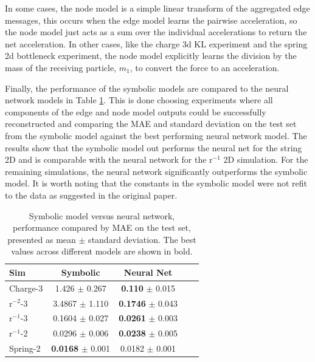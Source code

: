 \documentclass[11pt]{article}
\begin{document}
    In some cases, the node model is a simple linear transform of the aggregated edge messages, this occurs when the edge model learns the pairwise acceleration, so the node model just acts as a sum over the individual accelerations to return the net acceleration. In other cases, like the charge 3d KL experiment and the spring 2d bottleneck experiment, the node model explicitly learns the division by the mass of the receiving particle, $m_1$, to convert the force to an acceleration.

    Finally, the performance of the symbolic models are compared to the neural network models in Table \ref{tab:sr_vs_nn_table}. This is done choosing experiments where all components of the edge and node model outputs could be successfully reconstructed and comparing the MAE and standard deviation on the test set from the symbolic model against the best performing neural network model. The results show that the symbolic model out performs the neural net for the string 2D and is comparable with the neural network for the r$^{-1}$ 2D simulation. For the remaining simulations, the neural network significantly outperforms the symbolic model. It is worth noting that the constants in the symbolic model were not refit to the data as suggested in the original paper.
    \begin{table}[H]
        \centering
        \begin{tabular}{lcccc}
        \hline
        Sim & Symbolic & Neural Net \\
        \hline
        Charge-3 & 1.426 $\pm$ 0.267 & \textbf{0.110} $\pm$ 0.015 \\
        r$^{-2}$-3 & 3.4867 $\pm$ 1.110 & \textbf{0.1746} $\pm$ 0.043 \\
        r$^{-1}$-3 & 0.1604 $\pm$ 0.027 &\textbf{0.0261} $\pm$ 0.003 \\
        r$^{-1}$-2 & 0.0296 $\pm$ 0.006 & \textbf{0.0238} $\pm$ 0.005 \\
        Spring-2 & \textbf{0.0168} $\pm$ 0.001 & 0.0182 $\pm$ 0.001 \\
        \hline
        \end{tabular}
        \caption{Symbolic model versus neural network, performance compared by MAE on the test set, presented as mean $\pm$ standard deviation. The best values across different models are shown in bold.}
        \label{tab:sr_vs_nn_table}
    \end{table}
\end{document}
